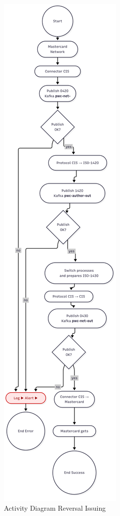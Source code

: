 \documentclass[12pt,a4paper]{report}
\begin{document}
\begin{figure}[H]
\centering
\includegraphics[width=\textwidth,height=0.85\textheight,keepaspectratio]{media/iss-rev-auth-req.png}
\caption{Activity Diagram  Reversal Issuing}
\label{fig:ACD}
\end{figure}
\clearpage
\end{document}
